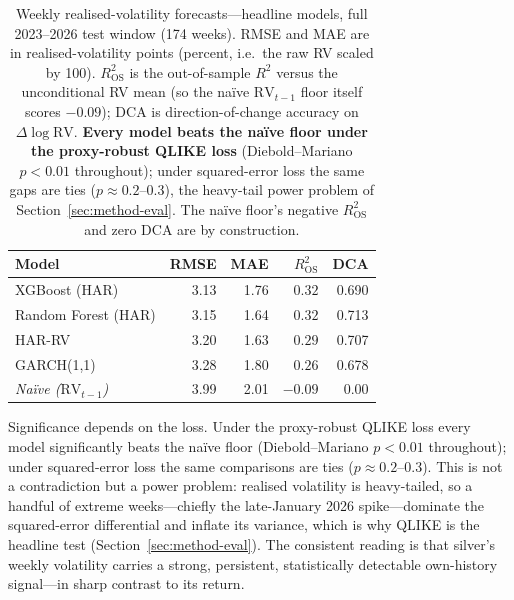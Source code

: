\documentclass[12pt, a4paper]{article}
\begin{document}
\begin{table}[htbp]
    \centering
    \footnotesize
    \setlength{\tabcolsep}{7pt}
    \caption{Weekly realised-volatility forecasts---headline models, full 2023--2026 test
    window (174 weeks). RMSE and MAE are in realised-volatility points (percent, i.e.\ the raw
    RV scaled by 100). \(R^2_{\text{OS}}\) is the out-of-sample \(R^2\) versus the unconditional
    RV mean (so the na\"ive \(\mathrm{RV}_{t-1}\) floor itself scores \(-0.09\)); DCA is
    direction-of-change accuracy on \(\Delta\log\mathrm{RV}\). \textbf{Every model beats the
    na\"ive floor under the proxy-robust QLIKE loss} (Diebold--Mariano \(p<0.01\) throughout);
    under squared-error loss the same gaps are ties (\(p\approx0.2\text{--}0.3\)), the
    heavy-tail power problem of Section~\ref{sec:method-eval}. The na\"ive floor's negative
    \(R^2_{\text{OS}}\) and zero DCA are by construction.}
    \label{tab:volatility-leaderboard}
    \begin{tabular}{l r r r r}
        \toprule
        Model & RMSE & MAE & \(R^2_{\text{OS}}\) & DCA \\
        \midrule
        XGBoost (HAR)        & 3.13 & 1.76 & $0.32$ & 0.690 \\
        Random Forest (HAR)  & 3.15 & 1.64 & $0.32$ & 0.713 \\
        HAR-RV               & 3.20 & 1.63 & $0.29$ & 0.707 \\
        GARCH(1,1)           & 3.28 & 1.80 & $0.26$ & 0.678 \\
        \midrule
        \textit{Na\"ive (\(\mathrm{RV}_{t-1}\))} & 3.99 & 2.01 & $-0.09$ & 0.00 \\
        \bottomrule
    \end{tabular}
\end{table}

Significance depends on the loss. Under the proxy-robust QLIKE loss every model significantly
beats the na\"ive floor (Diebold--Mariano \(p<0.01\) throughout); under squared-error loss the
same comparisons are ties (\(p\approx 0.2\)--\(0.3\)). This is not a contradiction but a power
problem: realised volatility is heavy-tailed, so a handful of extreme weeks---chiefly the
late-January 2026 spike---dominate the squared-error differential and inflate its variance, which is why QLIKE
is the headline test (Section~\ref{sec:method-eval}). The consistent reading is that silver's
weekly volatility carries a strong, persistent, statistically detectable own-history
signal---in sharp contrast to its return.
\end{document}
